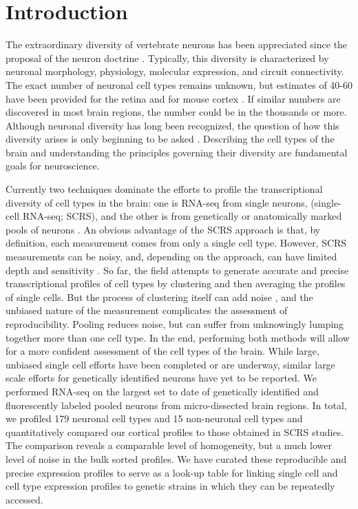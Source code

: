 \section*{Introduction}

The extraordinary diversity of vertebrate neurons has been appreciated since the proposal of the neuron doctrine \citep{Cajal_1888}. Typically, this diversity is characterized by neuronal morphology, physiology, molecular expression, and circuit connectivity. The exact number of neuronal cell types remains unknown, but estimates of 40-60 have been provided for the retina \citep{Macosko_2015,Masland_2004} and for mouse cortex \citep{Tasic_2016,Zeisel_2015}. If similar numbers are discovered in most brain regions, the number could be in the thousands or more. Although neuronal diversity has long been recognized, the question of how this diversity arises is only beginning to be asked \citep{Arendt_2008,Muotri_2006}. Describing the cell types of the brain and understanding the principles governing their diversity are fundamental goals for neuroscience.

Currently two techniques dominate the efforts to profile the transcriptional diversity of cell types in the brain: one is RNA-seq from single neurons, (single-cell RNA-seq; SCRS), \citep[e.g.][]{Shapiro_2013} and the other is from genetically or anatomically marked pools of neurons \citep[e.g.][]{Okaty_2015,Cembrowski_2016}.  An obvious advantage of the SCRS approach is that, by definition, each measurement comes from only a single cell type. However, SCRS measurements can be noisy, and, depending on the approach, can have limited depth and sensitivity \citep{Parekh_2016,Svensson_2017}. So far, the field attempts to generate accurate and precise transcriptional profiles of cell types by clustering and then averaging the profiles of single cells. But the process of clustering itself can add noise \citep{Ntranos_2016}, and the unbiased nature of the measurement complicates the assessment of reproducibility. Pooling reduces noise, but can suffer from unknowingly lumping together more than one cell type. In the end, performing both methods will allow for a more confident assessment of the cell types of the brain. While large, unbiased single cell efforts have been completed or are underway, similar large scale efforts for genetically identified neurons have yet to be reported. We performed RNA-seq on the largest set to date of genetically identified and fluorescently labeled pooled neurons from micro-dissected brain regions. In total, we profiled 179 neuronal cell types and 15 non-neuronal cell types and quantitatively compared our cortical profiles to those obtained in SCRS studies. The comparison reveals a comparable level of homogeneity, but a much lower level of noise in the bulk sorted profiles. We have curated these reproducible and precise expression profiles to serve as a look-up table for linking single cell and cell type expression profiles to genetic strains in which they can be repeatedly accessed. 

